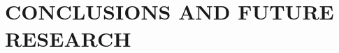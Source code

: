 \documentclass[../Dissertation]{subfiles}
\begin{document}
    \chapter{\uppercase{Conclusions and Future Research}}\label{chp:6}
     
    \vspace{-2ex}
    
    
    

\end{document}
